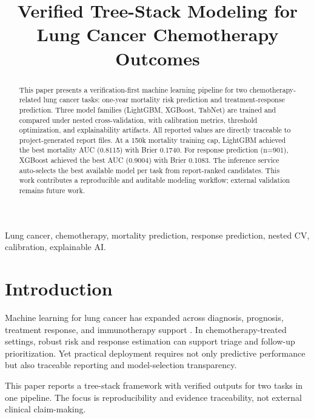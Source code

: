 \documentclass[conference]{IEEEtran}
\begin{document}
\title{Verified Tree-Stack Modeling for Lung Cancer Chemotherapy Outcomes}

\author{
}

\maketitle

\begin{abstract}
This paper presents a verification-first machine learning pipeline for two chemotherapy-related lung cancer tasks: one-year mortality risk prediction and treatment-response prediction. Three model families (LightGBM, XGBoost, TabNet) are trained and compared under nested cross-validation, with calibration metrics, threshold optimization, and explainability artifacts. All reported values are directly traceable to project-generated report files. At a 150k mortality training cap, LightGBM achieved the best mortality AUC (0.8115) with Brier 0.1740. For response prediction (n=901), XGBoost achieved the best AUC (0.9004) with Brier 0.1083. The inference service auto-selects the best available model per task from report-ranked candidates. This work contributes a reproducible and auditable modeling workflow; external validation remains future work.
\end{abstract}

\begin{IEEEkeywords}
Lung cancer, chemotherapy, mortality prediction, response prediction, nested CV, calibration, explainable AI.
\end{IEEEkeywords}

\section{Introduction}
Machine learning for lung cancer has expanded across diagnosis, prognosis, treatment response, and immunotherapy support \cite{li2022review}. In chemotherapy-treated settings, robust risk and response estimation can support triage and follow-up prioritization. Yet practical deployment requires not only predictive performance but also traceable reporting and model-selection transparency.

This paper reports a tree-stack framework with verified outputs for two tasks in one pipeline. The focus is reproducibility and evidence traceability, not external clinical claim-making.
\end{document}
